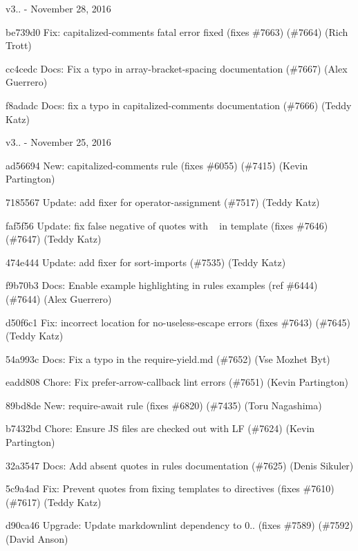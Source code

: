 v3.. -\/ November 28, 2016


\begin{DoxyItemize}
\item be739d0 Fix\+: capitalized-\/comments fatal error fixed (fixes \#7663) (\#7664) (Rich Trott)
\item cc4cedc Docs\+: Fix a typo in array-\/bracket-\/spacing documentation (\#7667) (Alex Guerrero)
\item f8adadc Docs\+: fix a typo in capitalized-\/comments documentation (\#7666) (Teddy Katz)
\end{DoxyItemize}

v3.. -\/ November 25, 2016


\begin{DoxyItemize}
\item ad56694 New\+: capitalized-\/comments rule (fixes \#6055) (\#7415) (Kevin Partington)
\item 7185567 Update\+: add fixer for {\ttfamily operator-\/assignment} (\#7517) (Teddy Katz)
\item faf5f56 Update\+: fix false negative of {\ttfamily quotes} with ~\newline
 in template (fixes \#7646) (\#7647) (Teddy Katz)
\item 474e444 Update\+: add fixer for {\ttfamily sort-\/imports} (\#7535) (Teddy Katz)
\item f9b70b3 Docs\+: Enable example highlighting in rules examples (ref \#6444) (\#7644) (Alex Guerrero)
\item d50f6c1 Fix\+: incorrect location for {\ttfamily no-\/useless-\/escape} errors (fixes \#7643) (\#7645) (Teddy Katz)
\item 54a993c Docs\+: Fix a typo in the require-\/yield.\+md (\#7652) (Vse Mozhet Byt)
\item eadd808 Chore\+: Fix prefer-\/arrow-\/callback lint errors (\#7651) (Kevin Partington)
\item 89bd8de New\+: {\ttfamily require-\/await} rule (fixes \#6820) (\#7435) (Toru Nagashima)
\item b7432bd Chore\+: Ensure JS files are checked out with LF (\#7624) (Kevin Partington)
\item 32a3547 Docs\+: Add absent quotes in rules documentation (\#7625) (Denis Sikuler)
\item 5c9a4ad Fix\+: Prevent {\ttfamily quotes} from fixing templates to directives (fixes \#7610) (\#7617) (Teddy Katz)
\item d90ca46 Upgrade\+: Update markdownlint dependency to 0.. (fixes \#7589) (\#7592) (David Anson)

\end{DoxyItemize}
